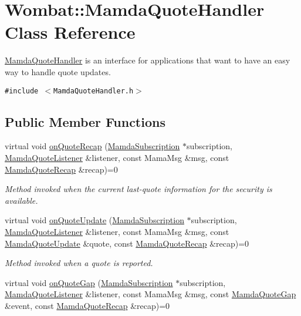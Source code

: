 \hypertarget{classWombat_1_1MamdaQuoteHandler}{
\section{Wombat::Mamda\-Quote\-Handler Class Reference}
\label{classWombat_1_1MamdaQuoteHandler}
}
\hyperlink{classWombat_1_1MamdaQuoteHandler}{Mamda\-Quote\-Handler} is an interface for applications that want to have an easy way to handle quote updates.  


{\tt \#include $<$Mamda\-Quote\-Handler.h$>$}

\subsection*{Public Member Functions}
\begin{CompactItemize}
\item 
virtual void \hyperlink{classWombat_1_1MamdaQuoteHandler_c89e4a78d1e7d7d99a7dd39319d06b1e}{on\-Quote\-Recap} (\hyperlink{classWombat_1_1MamdaSubscription}{Mamda\-Subscription} $\ast$subscription, \hyperlink{classWombat_1_1MamdaQuoteListener}{Mamda\-Quote\-Listener} \&listener, const Mama\-Msg \&msg, const \hyperlink{classWombat_1_1MamdaQuoteRecap}{Mamda\-Quote\-Recap} \&recap)=0
\begin{CompactList}\small\item\em Method invoked when the current last-quote information for the security is available. \item\end{CompactList}\item 
virtual void \hyperlink{classWombat_1_1MamdaQuoteHandler_6db8e745d6668d72d04114e6d9a908b4}{on\-Quote\-Update} (\hyperlink{classWombat_1_1MamdaSubscription}{Mamda\-Subscription} $\ast$subscription, \hyperlink{classWombat_1_1MamdaQuoteListener}{Mamda\-Quote\-Listener} \&listener, const Mama\-Msg \&msg, const \hyperlink{classWombat_1_1MamdaQuoteUpdate}{Mamda\-Quote\-Update} \&quote, const \hyperlink{classWombat_1_1MamdaQuoteRecap}{Mamda\-Quote\-Recap} \&recap)=0
\begin{CompactList}\small\item\em Method invoked when a quote is reported. \item\end{CompactList}\item 
virtual void \hyperlink{classWombat_1_1MamdaQuoteHandler_6fa51f8243ef1a46825813c02c4f05f1}{on\-Quote\-Gap} (\hyperlink{classWombat_1_1MamdaSubscription}{Mamda\-Subscription} $\ast$subscription, \hyperlink{classWombat_1_1MamdaQuoteListener}{Mamda\-Quote\-Listener} \&listener, const Mama\-Msg \&msg, const \hyperlink{classWombat_1_1MamdaQuoteGap}{Mamda\-Quote\-Gap} \&event, const \hyperlink{classWombat_1_1MamdaQuoteRecap}{Mamda\-Quote\-Recap} \&recap)=0

\end{CompactItemize}
